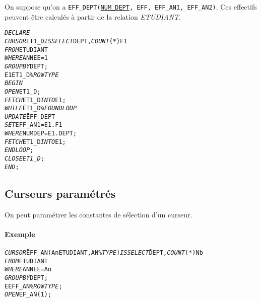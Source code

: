 \documentclass[10pt]{article}
\begin{document}
				On suppose qu'on a \texttt{EFF\_DEPT(}\underline{\texttt{NUM\_DEPT}}\texttt{, EFF, EFF\_AN1, EFF\_AN2)}. Ces effectifs peuvent être calculés à partir de la relation \emph{ETUDIANT}.
				
				\begin{alltt}
					\begin{tabbing}
						\emph{DECLARE}\=\\
							\>\emph{CURSOR} \= ET1_D \emph{IS} \=\emph{SELECT} \=DEPT, \emph{COUNT}(*) F1\\
									\>\>\emph{FROM}\>ETUDIANT\\
									\>\>\emph{WHERE}\>ANNEE=1\\
									\>\>\emph{GROUP BY} DEPT;\\
							\>E1\>ET1_D\%\emph{ROWTYPE}\\
						\emph{BEGIN}\\
							\>\emph{OPEN} ET1_D;\\
							\>\emph{FETCH} ET1_D \emph{INTO} E1;\\
							\>\emph{WHILE} \= ET1_D\%\emph{FOUND LOOP}\\
								\>\>\emph{UPDATE} \=EFF_DEPT\\
								\>\>\>\emph{SET}\>EFF_AN1=E1.F1\\
								\>\>\>\emph{WHERE}\>NUMDEP=E1.DEPT;\\
								\>\>\emph{FETCH} ET1_D \emph{INTO} E1;\\
							\>\emph{END LOOP};
							\>\emph{CLOSE ET1_D};
						\emph{END};
					\end{tabbing}
				\end{alltt}

		\subsection{Curseurs paramétrés}
			On peut paramétrer les constantes de sélection d'un curseur.
			
			\paragraph{Exemple}
				\begin{alltt}
					\begin{tabbing}
						\emph{CURSOR} \=EFF_AN(An ETUDIANT, AN\%\emph{TYPE}) \emph{IS} \=\emph{SELECT} \=DEPT, \emph{COUNT}(*) Nb\\
									\>\emph{FROM}\>ETUDIANT\\
									\>\emph{WHERE}\>ANNEE=An\\
									\>\emph{GROUP BY} DEPT;\\
						E \>EFF_AN\%\emph{ROWTYPE};\\
						\emph{OPEN} \>EF_AN(1);
					\end{tabbing}
				\end{alltt}
				
\end{document}
